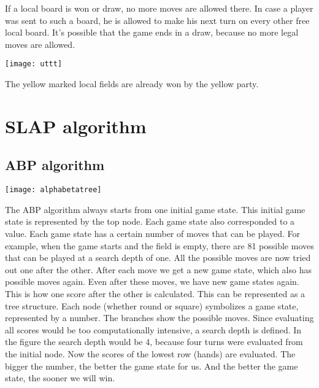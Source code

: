 If a local board is won or draw, no more moves are allowed there. In case a player was sent to such a board, he is allowed to make his next turn on every other free local board. It's possible that the game ends in a draw, because  no more legal moves are allowed.

\begin{fixedpic}
	\centering
	\texttt{[image: uttt]}
\end{fixedpic}

The yellow marked local fields are already won by the yellow party.

\section{\ac{SLAP} algorithm}

\subsection{\acl{ABP} algorithm} \label{abpalgo}
\begin{fixedpic}
	\centering
	\texttt{[image: alphabetatree]}
\end{fixedpic}



The \ac{ABP} algorithm always starts from one initial game state. This initial game state is represented by the top node. Each game state also corresponded to a value. Each game state has a certain number of moves that can be played. For example, when the game starts and the field is empty, there are 81 possible moves that can be played at a search depth of one.
All the possible moves are now tried out one after the other. After each move we get a new game state, which also has possible moves again. Even after these moves, we have new game states again. This is how one score after the other is calculated. This can be represented as a tree structure. Each node (whether round or square) symbolizes a game state, represented by a number. The branches show the possible moves. Since evaluating all scores would be too computationally intensive, a search depth is defined. In the figure the search depth would be 4, because four turns were evaluated from the initial node. Now the scores of the lowest row (hands) are evaluated. The bigger the number, the better the game state for us. And the better the game state, the sooner we will win.\\

